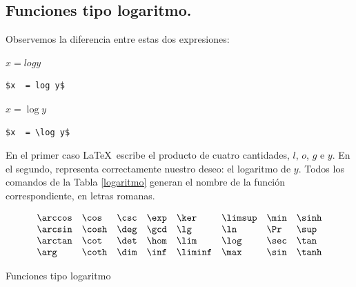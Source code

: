 \subsection{Funciones tipo logaritmo.}

Observemos la diferencia entre estas dos expresiones:

\vspace{.3cm}
{\small
\begin{minipage}[t]{5cm}
$x  = log y$
\end{minipage}
\hspace{2cm}
\begin{minipage}[t]{5cm}
\begin{verbatim}
$x  = log y$
\end{verbatim}
\end{minipage}

\begin{minipage}[t]{5cm}
$x  = \log y$
\end{minipage}
\hspace{2cm}
\begin{minipage}[t]{5cm}
\begin{verbatim}
$x  = \log y$
\end{verbatim}
\end{minipage}
}
\vspace{.3cm}

En el primer caso \LaTeX\ escribe el producto de cuatro cantidades,
$l$, $o$, $g$ e $y$. En el segundo, representa correctamente
nuestro deseo: el logaritmo de $y$. Todos los comandos de la Tabla
\ref{logaritmo} generan el nombre de la funci{\'o}n correspondiente, en
letras romanas.

\begin{table}
$$
\begin{array}{llllllll}
\verb+\arccos+ &
\verb+\cos+ &
\verb+\csc+ &
\verb+\exp+ &
\verb+\ker+ &
\verb+\limsup+ &
\verb+\min+ &
\verb+\sinh+ \\
\verb+\arcsin+ &
\verb+\cosh+ &
\verb+\deg+ &
\verb+\gcd+ &
\verb+\lg+ &
\verb+\ln+ &
\verb+\Pr+ &
\verb+\sup+ \\
\verb+\arctan+ &
\verb+\cot+ &
\verb+\det+ &
\verb+\hom+ &
\verb+\lim+ &
\verb+\log+ &
\verb+\sec+ &
\verb+\tan+ \\
\verb+\arg+ &
\verb+\coth+ &
\verb+\dim+ &
\verb+\inf+ &
\verb+\liminf+ &
\verb+\max+ &
\verb+\sin+ &
\verb+\tanh+ 
\end{array}
$$
\caption{Funciones tipo logaritmo}
\label{logaritmo}
\end{table}


